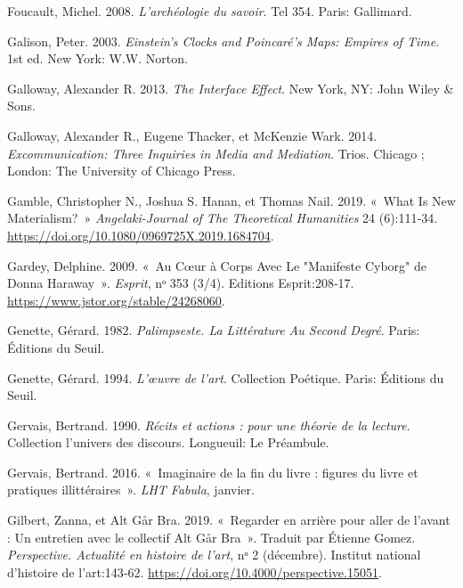 \begin{CSLReferences}{1}{0}
\leavevmode{}%
Foucault, Michel. 2008. \emph{{L'arch{é}ologie du savoir}}. {Tel} 354.
{Paris}: {Gallimard}.

\leavevmode{}%
Galison, Peter. 2003. \emph{Einstein's {Clocks} and {Poincar{é}}'s
{Maps}: {Empires} of {Time}}. 1st ed. {New York}: {W.W. Norton}.

\leavevmode{}%
Galloway, Alexander R. 2013. \emph{The {Interface Effect}}. {New York,
NY}: {John Wiley \& Sons}.

\leavevmode{}%
Galloway, Alexander R., Eugene Thacker, et McKenzie Wark. 2014.
\emph{Excommunication: {Three Inquiries} in {Media} and {Mediation}}.
Trios. {Chicago ; London}: {The University of Chicago Press}.

\leavevmode{}%
Gamble, Christopher N., Joshua S. Hanan, et Thomas Nail. 2019. {«~What
Is {New Materialism}?~»} \emph{Angelaki-Journal of The Theoretical
Humanities} 24 (6):111‑34.
\url{https://doi.org/10.1080/0969725X.2019.1684704}.

\leavevmode{}%
Gardey, Delphine. 2009. {«~Au C{œ}ur {à} Corps Avec Le "{Manifeste
Cyborg}" de {Donna Haraway}~»}. \emph{Esprit}, nᵒ 353 (3/4). {Editions
Esprit}:208‑17. \url{https://www.jstor.org/stable/24268060}.

\leavevmode{}%
Genette, Gérard. 1982. \emph{Palimpseste. {La Litt{é}rature} Au Second
Degr{é}}. {Paris}: {{É}ditions du Seuil}.

\leavevmode{}%
Genette, Gérard. 1994. \emph{L'{œ}uvre de l'art}. Collection
{Po{é}tique}. {Paris}: {{É}ditions du Seuil}.

\leavevmode{}%
Gervais, Bertrand. 1990. \emph{{R{é}cits et actions : pour une th{é}orie
de la lecture}}. {Collection l'univers des discours}. {Longueuil}: {Le
Pr{é}ambule}.

\leavevmode{}%
Gervais, Bertrand. 2016. {«~{Imaginaire de la fin du livre : figures du
livre et pratiques illitt{é}raires}~»}. \emph{LHT Fabula}, janvier.

\leavevmode{}%
Gilbert, Zanna, et Alt Går Bra. 2019. {«~{Regarder en arri{è}re pour
aller de l'avant : Un entretien avec le collectif Alt G{å}r Bra}~»}.
Traduit par Étienne Gomez. \emph{Perspective. Actualit{é} en histoire de
l'art}, nᵒ 2 (décembre). {Institut national d'histoire de l'art}:143‑62.
\url{https://doi.org/10.4000/perspective.15051}.


\end{CSLReferences}
